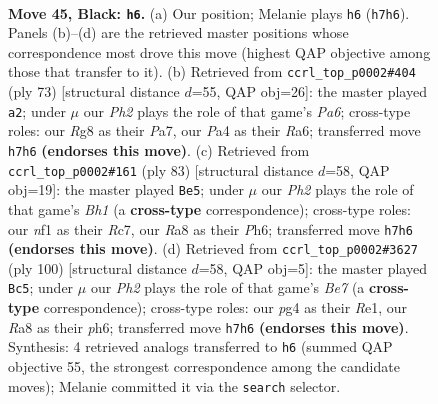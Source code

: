 \documentclass[11pt]{article}
\begin{document}
\clearpage

\begin{figure}[p]\centering
\begin{subfigure}{0.46\textwidth}\centering
\resizebox{\linewidth}{!}{%
\newchessgame
\chessboard[
  setfen={r5r1/p3b1pp/2k5/3p1Q1P/pq1P2P1/4P2K/8/5N2 b - - 5 45},
  showmover=false,
  pgfstyle=straightmove, color=movearrow, markmove={h7-h6}
]}
\caption{}
\end{subfigure}\hfill
\begin{subfigure}{0.46\textwidth}\centering
\resizebox{\linewidth}{!}{%
\newchessgame
\chessboard[
  setfen={2q5/p7/r4p1k/2P2b2/3Pp2B/pQ2P3/5P1K/7R b - - 0 37},
  showmover=false,
  pgfstyle=straightmove, color=movearrow, markmove={a3-a2}
]}
\caption{}
\end{subfigure}
\\[4pt]
\begin{subfigure}{0.46\textwidth}\centering
\resizebox{\linewidth}{!}{%
\newchessgame
\chessboard[
  setfen={7b/k1r1qp2/p6p/P5p1/1p4Q1/1N2P1PP/5PB1/6K1 b - - 4 42},
  showmover=false,
  pgfstyle=straightmove, color=movearrow, markmove={h8-e5}
]}
\caption{}
\end{subfigure}\hfill
\begin{subfigure}{0.46\textwidth}\centering
\resizebox{\linewidth}{!}{%
\newchessgame
\chessboard[
  setfen={6k1/2n1Brp1/2q1p2p/p7/3P4/1P5P/4Q1PK/4R3 w - - 15 51},
  showmover=false,
  pgfstyle=straightmove, color=movearrow, markmove={e7-c5}
]}
\caption{}
\end{subfigure}
\caption{\textbf{Move 45, Black: \texttt{h6}.} (a) Our position; Melanie plays \texttt{h6} (\texttt{h7h6}). Panels (b)--(d) are the retrieved master positions whose correspondence most drove this move (highest QAP objective among those that transfer to it). (b) Retrieved from \texttt{ccrl\_top\_p0002\#404} (ply 73) [structural distance $d$=55, QAP obj=26]: the master played \texttt{a2}; under $\mu$ our \emph{Ph2} plays the role of that game's \emph{Pa6}; cross-type roles: our \emph{R}g8 as their \emph{P}a7, our \emph{P}a4 as their \emph{R}a6; transferred move \texttt{h7h6} \textbf{(endorses this move)}. (c) Retrieved from \texttt{ccrl\_top\_p0002\#161} (ply 83) [structural distance $d$=58, QAP obj=19]: the master played \texttt{Be5}; under $\mu$ our \emph{Ph2} plays the role of that game's \emph{Bh1} (a \textbf{cross-type} correspondence); cross-type roles: our \emph{n}f1 as their \emph{R}c7, our \emph{R}a8 as their \emph{P}h6; transferred move \texttt{h7h6} \textbf{(endorses this move)}. (d) Retrieved from \texttt{ccrl\_top\_p0002\#3627} (ply 100) [structural distance $d$=58, QAP obj=5]: the master played \texttt{Bc5}; under $\mu$ our \emph{Ph2} plays the role of that game's \emph{Be7} (a \textbf{cross-type} correspondence); cross-type roles: our \emph{p}g4 as their \emph{R}e1, our \emph{R}a8 as their \emph{p}h6; transferred move \texttt{h7h6} \textbf{(endorses this move)}. Synthesis: 4 retrieved analogs transferred to \texttt{h6} (summed QAP objective 55, the strongest correspondence among the candidate moves); Melanie committed it via the \texttt{search} selector.}
\label{fig:thought-m89}
\end{figure}
\end{document}
